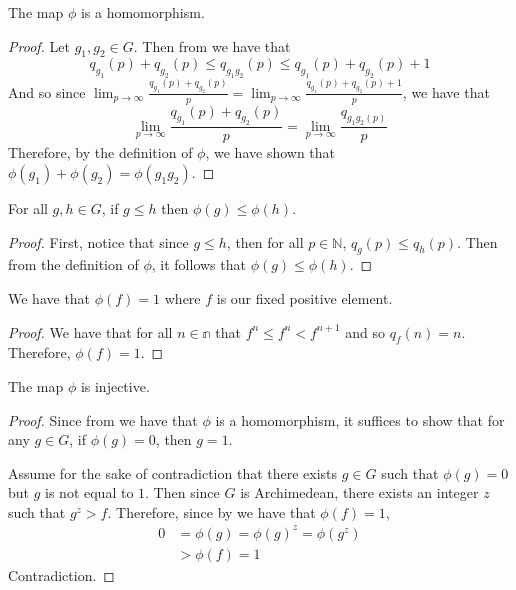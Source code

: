 \begin{theorem}\label{phi_hom}
    \leanok{}
    The map $\phi$ is a homomorphism.
\end{theorem}
\begin{proof}\leanok
Let $g_1, g_2 \in G$. Then from  we have that
\[
    q_{g_1}(p) + q_{g_2}(p) \le q_{g_1g_2}(p) \le q_{g_1}(p) + q_{g_2}(p) + 1
\]
And so since $\lim_{p\to\infty}\frac{q_{g_1}(p) + q_{g_2}(p)}{p} = \lim_{p\to\infty}\frac{q_{g_1}(p) + q_{g_2}(p) + 1}{p}$,
we have that
\[
\lim_{p\to\infty}\frac{q_{g_1}(p) + q_{g_2}(p)}{p} = \lim_{p\to\infty}\frac{q_{g_1g_2(p)}}{p}
\]
Therefore, by the definition of $\phi$, we have shown that $\phi(g_1)+\phi(g_2) = \phi(g_1g_2)$.
\end{proof}

\begin{theorem}\label{order_preserving_phi}
    \leanok{}
    For all $g,h \in G$, if $g \le h$ then $\phi(g) \le \phi(h)$.
\end{theorem}
\begin{proof}\leanok
First, notice that since $g\le h$, then for all $p \in \mathbb{N}$,
$q_g(p) \le q_h(p)$. Then from the definition of $\phi$, it follows that
$\phi(g) \le \phi(h)$.
\end{proof}

\begin{theorem}\label{f_maps_one}
    \leanok{}
    We have that $\phi(f) = 1$ where $f$ is our fixed
    positive element.
\end{theorem}
\begin{proof}\leanok
We have that for all $n\in \mathbb{n}$ that $f^n \le f^n < f^{n+1}$
and so $q_f(n) = n$. Therefore, $\phi(f) = 1$.
\end{proof}

\begin{theorem}\label{injective_phi}
    \leanok
    The map $\phi$ is injective.
\end{theorem}
\begin{proof}\leanok
Since from  we have that $\phi$ is a homomorphism,
it suffices to show that for any $g\in G$, if $\phi(g) = 0$, then $g = 1$.

Assume for the sake of contradiction that there exists $g \in G$
such that $\phi(g) = 0$ but $g$ is not equal to $1$.
Then since $G$ is Archimedean, there exists an integer $z$
such that $g^z > f$. Therefore, since by 
we have that $\phi(f) = 1$,
\begin{align*}
0 &= \phi(g) = \phi(g)^z = \phi(g^z)\\
&> \phi(f) = 1
\end{align*}
Contradiction.
\end{proof}

